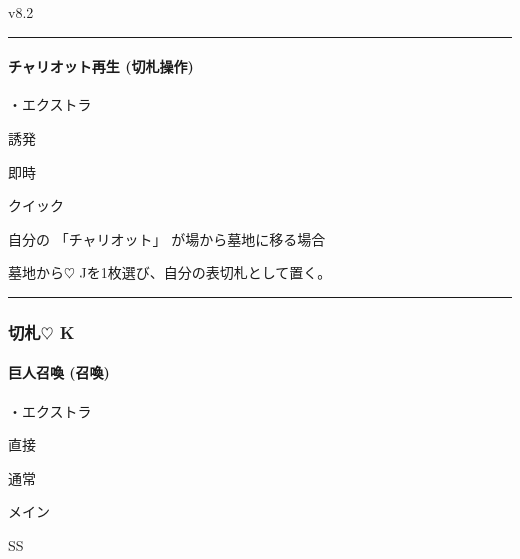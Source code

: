 \documentclass[letterpaper,10pt,dvipdfmx]{sphinxmanual}
\begin{document}
\sphinxAtStartPar
{}  v8.2


\bigskip\hrule\bigskip



\paragraph{チャリオット再生 (切札操作)}
\label{\detokenize{auto/frameActionlist:id50}}\label{\detokenize{auto/frameActionlist:id51}}
\sphinxAtStartPar
{}

\sphinxAtStartPar
・エクストラ

\sphinxAtStartPar
{} 誘発

\sphinxAtStartPar
{} 即時

\sphinxAtStartPar
{} クイック

\sphinxAtStartPar
{}

\sphinxAtStartPar
自分の 「チャリオット」 が場から墓地に移る場合

\sphinxAtStartPar
{}

\sphinxAtStartPar
墓地から{\normalsize $\heartsuit$} Jを1枚選び、自分の表切札として置く。


\bigskip\hrule\bigskip



\subsubsection{切札{\normalsize $\heartsuit$} K}
\label{\detokenize{auto/frameActionlist:id52}}

\paragraph{巨人召喚 (召喚)}
\label{\detokenize{auto/frameActionlist:act-summongiant}}\label{\detokenize{auto/frameActionlist:id53}}
\sphinxAtStartPar
{}

\sphinxAtStartPar
・エクストラ

\sphinxAtStartPar
{} 直接

\sphinxAtStartPar
{} 通常

\sphinxAtStartPar
{} メイン

\sphinxAtStartPar
{} SS

\sphinxAtStartPar
{}
\end{document}
